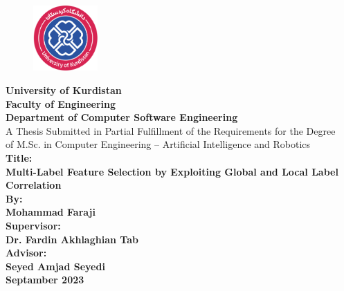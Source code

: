 
\newpage
\thispagestyle{empty}
\begin{center}
		\vspace*{-1.5cm}
	\begin{figure}[ht]
		\centerline{\includegraphics[height=2.5cm]{figures/UOK_LOGO.png}}
	\end{figure}
	\vspace*{-0.6cm}
	\textbf{{\Large University of Kurdistan}}
	\vspace*{-0.2cm}\\
	\textbf{{\large Faculty of Engineering}}
	\vspace*{-0.2cm}\\
	\textbf{Department of Computer Software Engineering}\\
	\vspace*{1cm}
A Thesis Submitted in Partial Fulfillment of the Requirements for the Degree\\
 of M.Sc. in  Computer Engineering – Artificial Intelligence and Robotics\\
	\vspace*{0.5cm}
	\textbf{\Large{Title:}}\\
	\textbf{{\Large
			Multi-Label Feature Selection by Exploiting Global and Local Label Correlation
	}}\\
	\vspace*{1cm}
	\textbf{By:}\\
	\textbf{
		{\Large
			Mohammad Faraji
		}
	}\\
	\vspace*{1cm}			
	\textbf{Supervisor:}\\
	\textbf{
		{\Large
			Dr. Fardin Akhlaghian Tab
		}
	}\\
	\vspace*{1cm}			
	\textbf{Advisor:}\\
	\textbf{
		{\Large
			Seyed Amjad Seyedi
		}
	}\\
	\vspace*{2cm}			
	\textbf{{Septamber 2023}}
\end{center}









